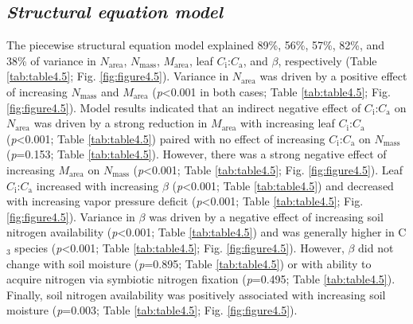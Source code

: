 \subsection{\textit{Structural equation model}}
\noindent The piecewise structural equation model explained 89\%, 56\%, 57\%, 82\%, and 38\% of variance in $N_\mathrm{area}$, $N_\mathrm{mass}$, $M_\mathrm{area}$, leaf $C_\mathrm{i}$:$C_\mathrm{a}$, and $\beta$, respectively (Table \ref{tab:table4.5}; Fig. \ref{fig:figure4.5}). Variance in $N_\mathrm{area}$ was driven by a positive effect of increasing $N_\mathrm{mass}$ and $M_\mathrm{area}$ (\textit{p}<0.001 in both cases; Table \ref{tab:table4.5}; Fig. \ref{fig:figure4.5}). Model results indicated that an indirect negative effect of $C_\mathrm{i}$:$C_\mathrm{a}$ on $N_\mathrm{area}$ was driven by a strong reduction in $M_\mathrm{area}$ with increasing leaf $C_\mathrm{i}$:$C_\mathrm{a}$ (\textit{p}<0.001; Table \ref{tab:table4.5}) paired with no effect of increasing $C_\mathrm{i}$:$C_\mathrm{a}$ on $N_\mathrm{mass}$ (\textit{p}=0.153; Table \ref{tab:table4.5}). However, there was a strong negative effect of increasing $M_\mathrm{area}$ on $N_\mathrm{mass}$ (\textit{p}<0.001; Table \ref{tab:table4.5}; Fig. \ref{fig:figure4.5}). Leaf $C_\mathrm{i}$:$C_\mathrm{a}$ increased with increasing $\beta$ (\textit{p}<0.001; Table \ref{tab:table4.5}) and decreased with increasing vapor pressure deficit (\textit{p}<0.001; Table \ref{tab:table4.5}; Fig. \ref{fig:figure4.5}). Variance in $\beta$ was driven by a negative effect of increasing soil nitrogen availability (\textit{p}<0.001; Table \ref{tab:table4.5}) and was generally higher in C$_3$ species (\textit{p}<0.001; Table \ref{tab:table4.5}; Fig. \ref{fig:figure4.5}). However, $\beta$ did not change with soil moisture (\textit{p}=0.895; Table \ref{tab:table4.5}) or with ability to acquire nitrogen via symbiotic nitrogen fixation (\textit{p}=0.495; Table \ref{tab:table4.5}). Finally, soil nitrogen availability was positively associated with increasing soil moisture (\textit{p}=0.003; Table \ref{tab:table4.5}; Fig. \ref{fig:figure4.5}).

